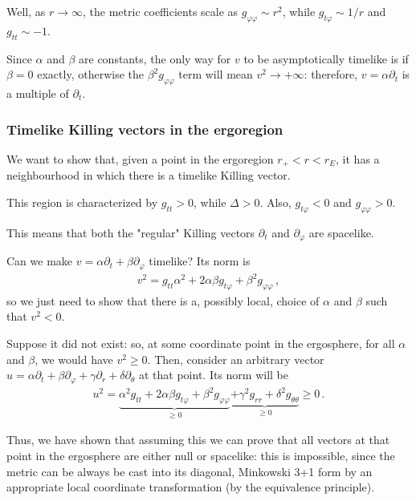 \documentclass[main.tex]{subfiles}
\begin{document}
Well, as \(r \to \infty \), the metric coefficients scale as \(g_{\varphi \varphi } \sim r^2 \), while \(g_{t \varphi } \sim 1 /r\) and \(g_{tt} \sim -1\).

Since \(\alpha\) and \(\beta\) are constants, the only way for \(v\) to be asymptotically timelike is if \(\beta = 0\) exactly, otherwise the \(\beta^2 g_{\varphi \varphi }\) term will mean \(v^2 \to + \infty \): therefore, \(v = \alpha \partial_t\) is a multiple of \(\partial_t\). 

\subsubsection{Timelike Killing vectors in the ergoregion}

We want to show that, given a point in the ergoregion \(r_+ < r < r_E\), it has a neighbourhood in which there is a timelike Killing vector.

This region is characterized by \(g_{tt} > 0\), while \(\Delta > 0\).
Also, \(g_{t \varphi } < 0\) and \(g_{\varphi \varphi } > 0\). 

This means that both the "regular" Killing vectors \(\partial_t\) and \(\partial_\varphi \) are spacelike. 

Can we make \(v = \alpha \partial_t + \beta \partial_\varphi \) timelike?
Its norm is 
%
\begin{align}
v^2 = g_{tt} \alpha^2 + 2 \alpha \beta g_{t \varphi } + \beta^2 g_{\varphi \varphi }
\,,
\end{align}
%
so we just need to show that there is a, possibly local, choice of \(\alpha \) and \(\beta \) such that \(v^2 < 0\).

Suppose it did not exist: so, at some coordinate point in the ergosphere, for all \(\alpha \) and \(\beta \), we would have \(v^2 \geq 0\). 
Then, consider an arbitrary vector \(u = \alpha \partial_t + \beta \partial_\varphi + \gamma \partial_r + \delta \partial_\theta \) at that point. 
Its norm will be  
%
\begin{align}
u^2 = \underbrace{\alpha^2 g_{tt} + 2 \alpha \beta g_{t \varphi } + \beta^2 g_{\varphi \varphi }}_{\geq 0} \underbrace{+ \gamma^2 g_{rr} + \delta^2 g_{\theta \theta }}_{\geq 0} \geq 0
\,.
\end{align}

Thus, we have shown that assuming this we can prove that all vectors at that point in the ergosphere are either null or spacelike: 
this is impossible, since the metric can be always be cast into its diagonal, Minkowski 3+1 form by an appropriate local coordinate transformation (by the equivalence principle).
\end{document}
